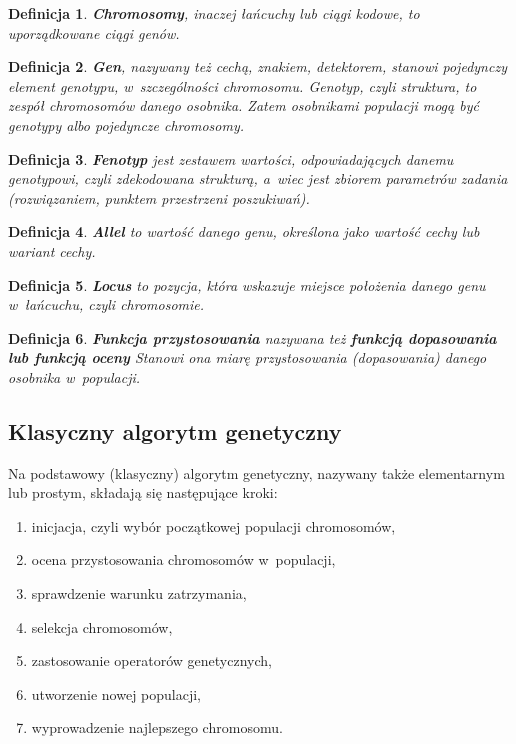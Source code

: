 \documentclass[twoside,12pt]{report}
\newtheorem{definition}{Definicja} %
\begin{document}
\begin{definition}
\textbf{Chromosomy}, inaczej łańcuchy lub ciągi kodowe, to uporządkowane ciągi genów.
\end{definition}

\begin{definition}
\textbf{Gen}, nazywany też cechą, znakiem, detektorem, stanowi pojedynczy element
genotypu, w~szczególności chromosomu. Genotyp, czyli struktura, to zespół chromosomów
danego osobnika. Zatem osobnikami populacji mogą być genotypy albo
pojedyncze chromosomy.
\end{definition}

\begin{definition}
\textbf{Fenotyp} jest zestawem wartości, odpowiadających danemu genotypowi, czyli zdekodowana strukturą, a~wiec jest zbiorem parametrów zadania (rozwiązaniem, punktem przestrzeni
poszukiwań).
\end{definition}

\begin{definition}
\textbf{Allel} to wartość danego genu, określona jako wartość cechy lub wariant cechy.
\end{definition}

\begin{definition}
\textbf{Locus} to pozycja, która wskazuje miejsce położenia danego genu w~łańcuchu, czyli chromosomie.
\end{definition}

\begin{definition}
\textbf{Funkcja przystosowania} nazywana też \textbf{funkcją dopasowania lub funkcją oceny} Stanowi ona miarę przystosowania (dopasowania) danego osobnika w~populacji.
\end{definition}

\subsection{Klasyczny algorytm genetyczny}

Na podstawowy (klasyczny) algorytm genetyczny, nazywany także elementarnym lub prostym, składają się następujące kroki:

\begin{enumerate}
\item inicjacja, czyli wybór początkowej populacji chromosomów,
\item ocena przystosowania chromosomów w~populacji,
\item sprawdzenie warunku zatrzymania,
\item selekcja chromosomów,
\item zastosowanie operatorów genetycznych,
\item utworzenie nowej populacji,
\item wyprowadzenie najlepszego chromosomu.
\end{enumerate}
\end{document}
